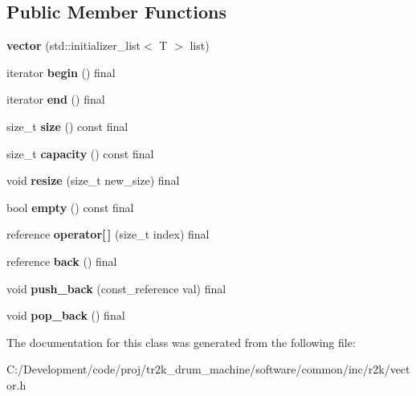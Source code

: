 \subsection*{Public Member Functions}
\begin{DoxyCompactItemize}
\item 
\mbox{\label{classr2k_1_1vector_a2d34a926326d09caf04e2f9fef3c7639}} 
{\bfseries vector} (std\+::initializer\+\_\+list$<$ T $>$ list)
\item 
\mbox{\label{classr2k_1_1vector_ad97dcdfbffc7861b98db53a989e5ef1b}} 
iterator {\bfseries begin} () final
\item 
\mbox{\label{classr2k_1_1vector_a4ec92e257ec07dd3dcc6ad7dea48e38f}} 
iterator {\bfseries end} () final
\item 
\mbox{\label{classr2k_1_1vector_adc409c3e3abec361aed5e6b84c75c672}} 
size\+\_\+t {\bfseries size} () const final
\item 
\mbox{\label{classr2k_1_1vector_af41940ac9c07142b1c88477ebee14b2d}} 
size\+\_\+t {\bfseries capacity} () const final
\item 
\mbox{\label{classr2k_1_1vector_a25615e7c045cfdcc3708748ef652b8d4}} 
void {\bfseries resize} (size\+\_\+t new\+\_\+size) final
\item 
\mbox{\label{classr2k_1_1vector_aba33ce74792e2586fa00f5fe53b417e6}} 
bool {\bfseries empty} () const final
\item 
\mbox{\label{classr2k_1_1vector_a089d03b612cf42f0cf726c2473a1ac67}} 
reference {\bfseries operator\mbox{[}$\,$\mbox{]}} (size\+\_\+t index) final
\item 
\mbox{\label{classr2k_1_1vector_a41640207a0d0a01388ed23bd73dc55a8}} 
reference {\bfseries back} () final
\item 
\mbox{\label{classr2k_1_1vector_a5bb6f8917bf4970ebf6cf3f47b8d6c11}} 
void {\bfseries push\+\_\+back} (const\+\_\+reference val) final
\item 
\mbox{\label{classr2k_1_1vector_aa9ccbcf949a833c555dcdb53710b8462}} 
void {\bfseries pop\+\_\+back} () final
\end{DoxyCompactItemize}


The documentation for this class was generated from the following file\+:\begin{DoxyCompactItemize}
\item 
C\+:/\+Development/code/proj/tr2k\+\_\+drum\+\_\+machine/software/common/inc/r2k/vector.\+h\end{DoxyCompactItemize}
